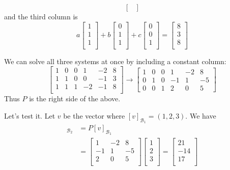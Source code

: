 \documentclass{article}
\begin{document}
\begin{example}
\[\begin{bmatrix}
    \end{bmatrix}
  \] and the third column is \[
    a
    \begin{bmatrix}
      1\\1\\1\\
    \end{bmatrix}+b
    \begin{bmatrix}
      0\\1\\1\\
    \end{bmatrix} + c
    \begin{bmatrix}
      0\\0\\1\\
    \end{bmatrix} =
    \begin{bmatrix}
      8\\3\\8\\
    \end{bmatrix}
  \]

  We can solve all three systems at once by including a constant column:
  \[
    \left[
      \begin{array}{ccc|ccc}
        1 & 0 & 0 & 1 & -2 & 8\\
        1 & 1 & 0 & 0 & -1 & 3\\
        1 & 1 & 1 & -2 & -1 & 8\\
    \end{array}\right] \to \left[
      \begin{array}{ccc|ccc}
        1 & 0 & 0 & 1 & -2 & 8\\
        0 & 1 & 0 & -1 & 1 & -5\\
        0 & 0 & 1 & 2 & 0 & 5
    \end{array}\right]
  \]
  Thus $P$ is the right side of the above.

  Let's test it. Let $v$ be the vector where $[v]_{\mathcal{B}_1} = (1, 2, 3)$. We have
  \begin{align*}
    [v]_{\mathcal{B}_2} &= P[v]_{\mathcal{B}_1}\\
    &=
    \begin{bmatrix}
      1 & -2 & 8\\
      -1 & 1 & -5\\
      2 & 0 & 5\\
    \end{bmatrix}
    \begin{bmatrix}
      1\\2\\3\\
    \end{bmatrix} =
    \begin{bmatrix}
      21\\-14\\17\\
    \end{bmatrix}
  \end{align*}


\end{example}
\end{document}
